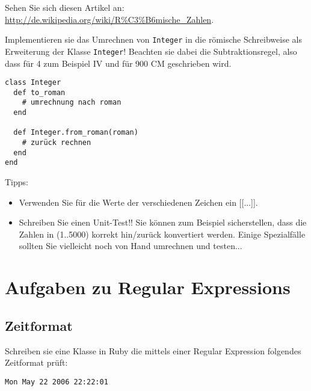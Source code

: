 \documentclass[a4paper,11pt,oneside]{scrbook}
\begin{document}
Sehen Sie sich diesen Artikel an: \url{http://de.wikipedia.org/wiki/R%C3%B6mische_Zahlen}.

Implementieren sie das Umrechnen von \texttt{Integer} in die römische Schreibweise als Erweiterung der Klasse \texttt{Integer}! Beachten sie dabei die Subtraktionsregel, also dass für 4 zum Beispiel IV und für 900 CM geschrieben wird.

\begin{lstlisting}
class Integer
  def to_roman
    # umrechnung nach roman
  end

  def Integer.from_roman(roman)
    # zurück rechnen
  end
end
\end{lstlisting}

Tipps:
\begin{itemize}
	\item Verwenden Sie für die Werte der verschiedenen Zeichen ein [[...]].
	\item Schreiben Sie einen Unit-Test!! Sie können zum Beispiel sicherstellen, dass die Zahlen in (1..5000) korrekt hin/zurück konvertiert werden. Einige Spezialfälle sollten Sie vielleicht noch von Hand umrechnen und testen...
\end{itemize}























\chapter{Aufgaben zu Regular Expressions} %
\label{cha:aufgaben_zu_regular_expressions}

\section{Zeitformat} %
\label{sec:zeitformat}
Schreiben sie eine Klasse in Ruby die mittels einer Regular Expression folgendes Zeitformat prüft:

\begin{lstlisting}
Mon May 22 2006 22:22:01
\end{lstlisting}
\end{document}

